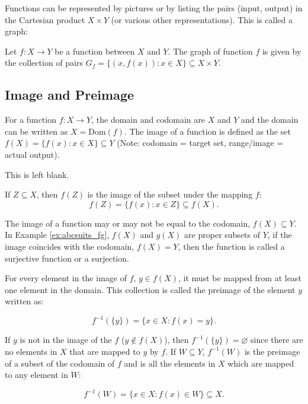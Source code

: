 Functions can be represented by pictures or by listing the pairs (input, output) in the Cartesian product $X \times Y$ (or various other representations). This is called a graph:

\begin{definition}[Graph]
    Let $f : X \to Y$ be a function between $X$ and $Y$. The graph  of function $f$ is given by the collection of pairs $G_f = \{(x,f(x)):x\in X\} \subseteq X \times Y$.
\end{definition}

\subsection{Image and Preimage}

For a function $f : X \to Y$, the domain and codomain are $X$ and $Y$ and the domain can be written as $X = \text{Dom}(f)$. The image  of a function is defined as the set $f(X) = \{f(x): x\in X\} \subseteq Y$ (Note: codomain = target set, range/image = actual output).

\begin{remark}
    This is left blank.
\end{remark}

If $Z \subseteq X$, then $f(Z)$ is the image of the subset under the mapping $f$:
$$
f(Z) = \{f(x):x\in Z\} \subseteq f(X).
$$

The image of a function may or may not be equal to the codomain, $f(X) \subseteq Y$. In Example \ref{ex:abcsuits_fg}, $f(X)$ and $g(X)$ are proper subsets of $Y$, if the image coincides with the codomain, $f(X) = Y$, then the function is called a surjective function or a surjection.

For every element in the image of $f$, $y \in f(X)$, it must be mapped from at least one element in the domain. This collection is called the preimage of the element $y$ written as:

$$
f^{-1}(\{y\}) = \{x \in X : f(x) = y\}.
$$

If $y$ is not in the image of the $f$ ($y \not\in f(X)$), then $f^{-1}(\{y\}) = \varnothing$ since there are no elements in $X$ that are mapped to $y$ by $f$. If $W \subseteq Y$, $f^{-1}(W)$ is the preimage of a subset of the codomain of $f$ and is all the elements in $X$ which are mapped to any element in $W$:

$$
f^{-1}(W) = \{x \in X : f(x) \in W\} \subseteq X.
$$

